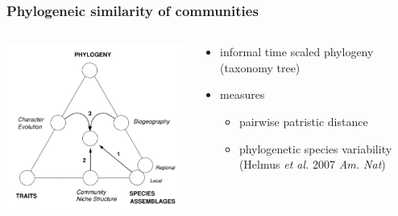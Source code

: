 \documentclass{beamer}
\begin{document}
\begin{frame}
  \frametitle{Phylogeneic similarity of communities}

  \begin{columns}
    \begin{column}{0.5\textwidth}
      \includegraphics[height = 0.8\textheight, width = \textwidth,  keepaspectratio = true]{figure/webb}

      \tiny{}
    \end{column}
    \begin{column}{0.5\textwidth}
      \begin{itemize}
        \item informal time scaled phylogeny \\(taxonomy tree)
        \item measures
          \begin{itemize}
            \item pairwise patristic distance 
            \item phylogenetic species variability (Helmus \textit{et al.} 2007 \textit{Am. Nat})
          \end{itemize}
      \end{itemize}
    \end{column}
  \end{columns}
\end{frame}
\end{document}
